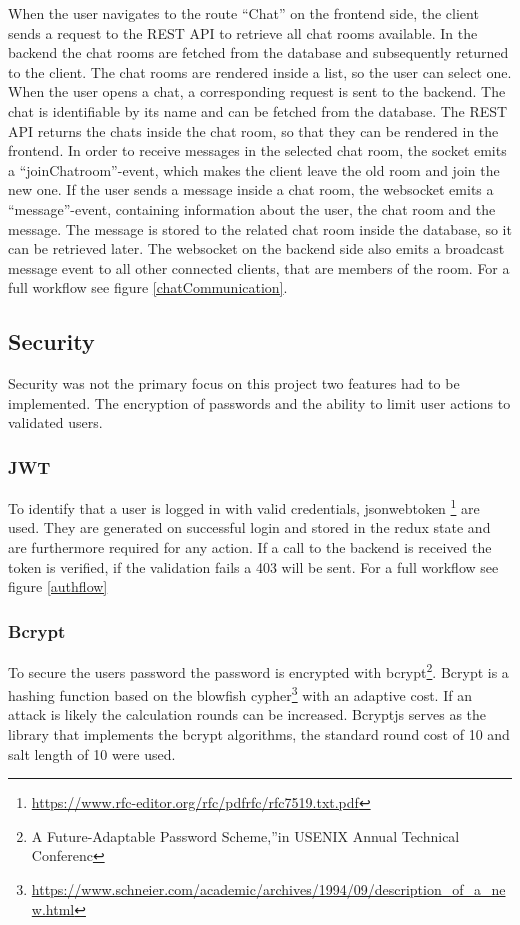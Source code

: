 When the user navigates  to the route “Chat” on the frontend side, the client sends a request to the REST API to retrieve all chat rooms available. In the backend the chat rooms are fetched from the database and subsequently returned to the client.
The chat rooms are rendered inside a list, so the user can select one.
When the user opens a chat, a corresponding request is sent to the backend. The chat is identifiable by its name and can be fetched from the database.
The REST API returns the chats inside the chat room, so that they can be rendered in the frontend.
In order to receive messages in the selected chat room, the socket emits a “joinChatroom”-event, which makes the client leave the old room and join the new one.
If the user sends a message inside a chat room, the websocket emits a “message”-event, containing information about the user, the chat room and the message. 
The message is stored to the related chat room inside the database, so it can be retrieved later.
The websocket on the backend side also emits a broadcast message event to all other connected clients, that are members of the room. For a full workflow see figure \ref{chatCommunication}.


\subsection{Security}
Security was not the primary focus on this project two features had to be implemented. The encryption of passwords and the ability to limit user actions to validated users. 
\subsubsection{JWT}
To identify that a user is logged in with valid credentials, jsonwebtoken \footnote{\url{https://www.rfc-editor.org/rfc/pdfrfc/rfc7519.txt.pdf}} are used. They are generated on successful login and stored in the redux state and are furthermore required for any action. If a call to the backend is received the token is verified, if the validation fails a 403 will be sent. For a full workflow see figure \ref{authflow}

\subsubsection{Bcrypt}
To secure the users password the password is encrypted with bcrypt\footnote{A  Future-Adaptable  Password  Scheme,”in USENIX Annual Technical Conferenc}. Bcrypt is a hashing function based on the blowfish cypher\footnote{\url{https://www.schneier.com/academic/archives/1994/09/description\_of\_a\_new.html}} with an adaptive cost. If an attack is likely the calculation rounds can be increased. Bcryptjs serves as the library that implements the bcrypt algorithms, the standard round cost of 10 and salt length of 10 were used.

